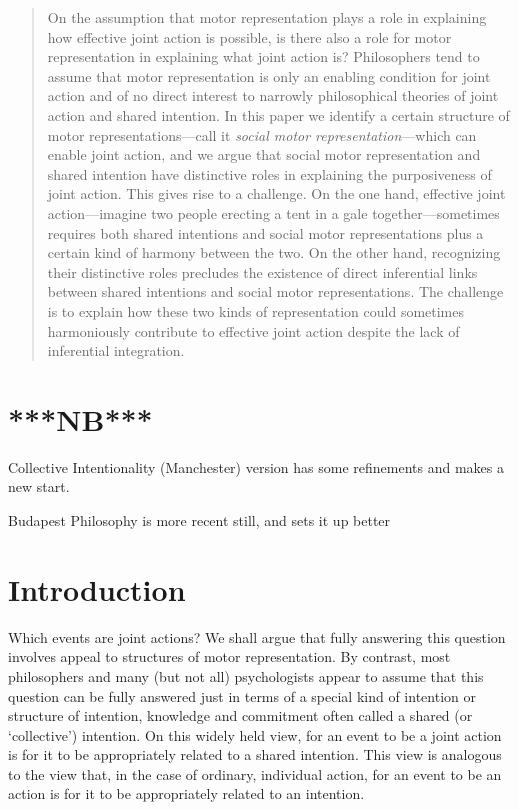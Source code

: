 \documentclass[12pt,\papersize]{extarticle}
\begin{document}
\setlength\footnotesep{1em}


\maketitle
\title{}

\begin{abstract}
\noindent
On the assumption that motor representation plays a role in explaining how effective joint action is possible, is there also a role for motor representation in explaining what joint action is?  
Philosophers tend to assume that motor representation is only an enabling condition for joint action and of no direct interest to narrowly philosophical theories of joint action and shared intention.  In this paper we identify a certain structure of motor representations---call it \textit{social motor representation}---which can enable joint action,
and we argue that social motor representation and shared intention  have distinctive roles in explaining the purposiveness of joint action.  This gives rise to a challenge.  On the one hand, effective joint action---imagine two people erecting a tent in a gale together---sometimes requires both shared intentions and social motor representations plus a certain kind of harmony between the two.  On the other hand, recognizing their distinctive roles precludes the existence of direct inferential links between shared intentions and social motor representations.  The challenge is to explain how these two kinds of representation could sometimes harmoniously contribute to effective joint action despite the lack of inferential integration.
\end{abstract}

\section{***NB***}
Collective Intentionality (Manchester) version has some refinements and makes a new start.

Budapest Philosophy is more recent still, and sets it up better

\section{Introduction}
Which events are joint actions?
We shall argue that fully answering this question involves appeal to structures of motor representation.
By contrast, 
most philosophers and many (but not all) psychologists appear to assume that this question can be fully answered just in terms of a special kind of intention or structure of intention, knowledge and commitment often called a shared (or `collective') intention.
On this widely held view, for an event to be a joint action is for it to be appropriately related to a shared intention.
This view is analogous to the view that, in the case of ordinary, individual action, 
 for an event to be an action is for it to be appropriately related to an intention.
\end{document}
